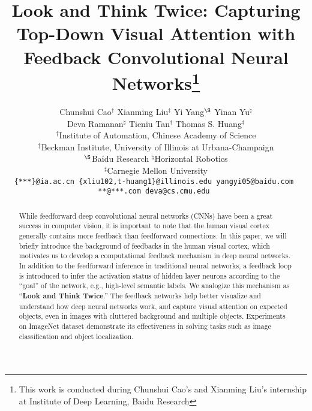 \documentclass[10pt,twocolumn,letterpaper]{article}
\begin{document}
\title{Look and Think Twice: Capturing Top-Down Visual Attention with Feedback Convolutional Neural Networks\thanks{This work is conducted during Chunshui Cao's and Xianming Liu's internship at Institute of Deep Learning, Baidu Research }}


\author{Chunshui Cao$^\dag$ \;\; Xianming Liu$^\ddag$ \;\; Yi Yang$^\S$ \;\; Yinan Yu$^\natural$ \;\; \\
Deva Ramanan$^\sharp$ \;\; Tieniu Tan$^\dag$ \;\; Thomas S. Huang$^\ddag$ \\
$^\dag$Institute of Automation, Chinese Academy of Science\\
$^\ddag$Beckman Institute, University of Illinois at Urbana-Champaign\\
$^\S$Baidu Research \quad $^\natural$Horizontal Robotics\\
$^\sharp$Carnegie Mellon University \\
{\tt \small \{***\}@ia.ac.cn \;\; \{xliu102,t-huang1\}@illinois.edu \;\; yangyi05@baidu.com \;\;}\\
{\tt \small ***@***.com \;\; deva@cs.cmu.edu }
}

\maketitle


\begin{abstract}
While feedforward deep convolutional neural networks (CNNs) have been a great success in computer vision, it is important to note that the human visual cortex generally contains more feedback than feedforward connections.
In this paper, we will briefly introduce the background of feedbacks in the human visual cortex, which motivates us to develop a computational feedback mechanism in deep neural networks.
In addition to the feedforward inference in traditional neural networks, a feedback loop is introduced to infer the activation status of hidden layer neurons according to the ``goal'' of the network, e.g., high-level semantic labels.
We analogize this mechanism as ``\textbf{Look and Think Twice}.''
The feedback networks help better visualize and understand how deep neural networks work, and capture visual attention on expected objects, even in images with cluttered background and multiple objects.
Experiments on ImageNet dataset demonstrate its effectiveness in solving tasks such as image classification and object localization.
\end{abstract}







{\small


}
\end{document}
